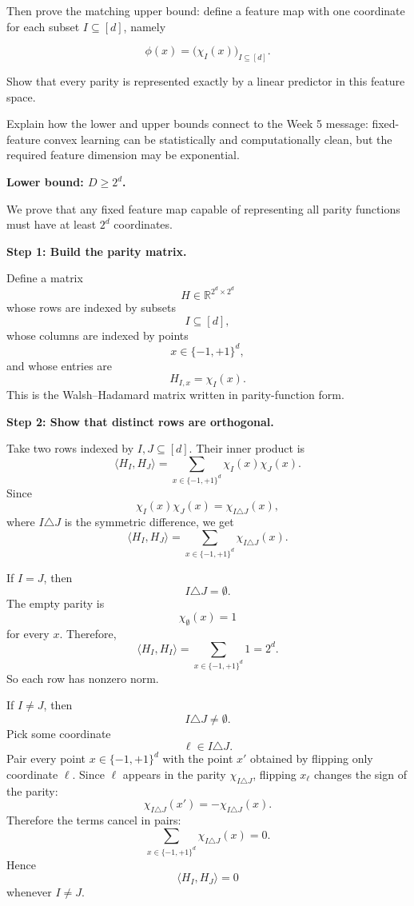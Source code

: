 \documentclass[11pt]{article}
\begin{document}
\begin{enumerate}
    \medskip
    Then prove the matching upper bound: define a feature map with one coordinate for each 
    subset $I \subseteq [d]$, namely
    
    
    \[
    \phi(x) = \bigl( \chi_I(x) \bigr)_{I \subseteq [d]}.
    \]
    
    
    Show that every parity is represented exactly by a linear predictor in this feature space.
    
    Explain how the lower and upper bounds connect to the Week 5 message: fixed-feature 
    convex learning can be statistically and computationally clean, but the required feature 
    dimension may be exponential.

    \begin{solutionbox}

    \textbf{Lower bound: $D\ge 2^d$.}

    We prove that any fixed feature map capable of representing all parity functions must have
    at least $2^d$ coordinates.

    \medskip

    \textbf{Step 1: Build the parity matrix.}

    Define a matrix
    \[
    H\in\mathbb{R}^{2^d\times 2^d}
    \]
    whose rows are indexed by subsets
    \[
    I\subseteq[d],
    \]
    whose columns are indexed by points
    \[
    x\in\{-1,+1\}^d,
    \]
    and whose entries are
    \[
    H_{I,x}=\chi_I(x).
    \]
    This is the Walsh--Hadamard matrix written in parity-function form.

    \medskip

    \textbf{Step 2: Show that distinct rows are orthogonal.}

    Take two rows indexed by $I,J\subseteq[d]$. Their inner product is
    \[
    \langle H_I,H_J\rangle
    =
    \sum_{x\in\{-1,+1\}^d}\chi_I(x)\chi_J(x).
    \]
    Since
    \[
    \chi_I(x)\chi_J(x)
    =
    \chi_{I\triangle J}(x),
    \]
    where $I\triangle J$ is the symmetric difference, we get
    \[
    \langle H_I,H_J\rangle
    =
    \sum_{x\in\{-1,+1\}^d}\chi_{I\triangle J}(x).
    \]

    If $I=J$, then
    \[
    I\triangle J=\emptyset.
    \]
    The empty parity is
    \[
    \chi_\emptyset(x)=1
    \]
    for every $x$. Therefore,
    \[
    \langle H_I,H_I\rangle
    =
    \sum_{x\in\{-1,+1\}^d}1
    =
    2^d.
    \]
    So each row has nonzero norm.

    If $I\ne J$, then
    \[
    I\triangle J\ne\emptyset.
    \]
    Pick some coordinate
    \[
    \ell\in I\triangle J.
    \]
    Pair every point $x\in\{-1,+1\}^d$ with the point $x'$ obtained by flipping only coordinate
    $\ell$. Since $\ell$ appears in the parity $\chi_{I\triangle J}$, flipping $x_\ell$ changes
    the sign of the parity:
    \[
    \chi_{I\triangle J}(x')=-\chi_{I\triangle J}(x).
    \]
    Therefore the terms cancel in pairs:
    \[
    \sum_{x\in\{-1,+1\}^d}\chi_{I\triangle J}(x)=0.
    \]
    Hence
    \[
    \langle H_I,H_J\rangle=0
    \]
    whenever $I\ne J$.


\end{solutionbox}
\end{enumerate}
\end{document}

